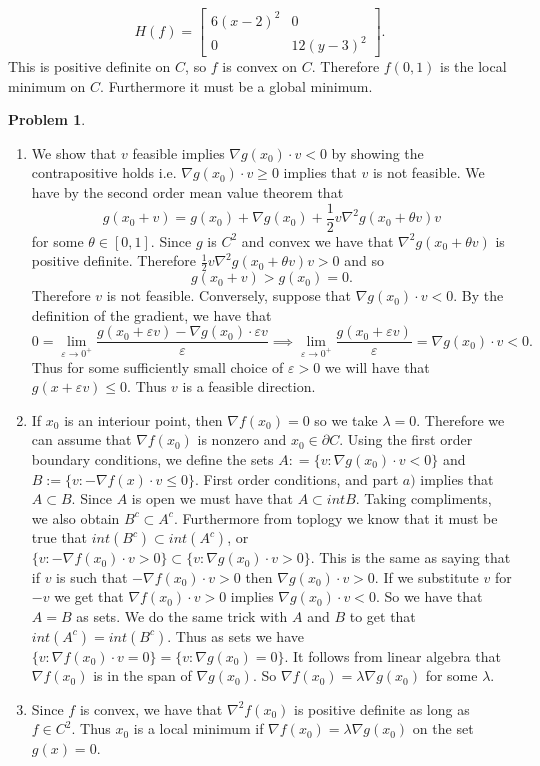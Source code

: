 \documentclass[12pt, a4paper]{article}
\newtheorem{problem}{Problem}
\theoremstyle{definition}
\newcommand{\penum}{ \begin{enumerate}[label=\bf(\alph*), leftmargin=0pt]}
\newcommand{\epenum}{ \end{enumerate} }
\newcommand{\bd}{\partial}
\newcommand{\grad}{\nabla}
\newcommand{\ep}{\varepsilon}
\newcommand{\bmat}[1]{\begin{bmatrix}#1\end{bmatrix}}
\begin{document}
$$H(f) = \bmat{6(x-2)^2 & 0 \\ 0 & 12(y-3)^2}.$$
This is positive definite on $C$, so $f$ is convex on $C$. Therefore $f(0,1)$ is the local minimum on $C$. Furthermore it must be a global minimum. 
\newpage
\begin{problem}
\end{problem}
\penum 
\item We show that $v$ feasible implies $\grad g(x_0) \cdot v<0$ by showing the contrapositive holds i.e. $\grad g(x_0)\cdot v \geq 0$ implies that $v$ is not feasible. We have by the second order mean value theorem that 
$$g(x_0 + v ) = g(x_0)  + \grad g(x_0) + \frac{1}{2} v \grad^2 g(x_0 + \theta v)v $$
 for some $\theta \in [0,1]$. Since $g$ is $C^2$ and convex we have that $\grad^2 g(x_0 + \theta v)$ is positive definite. Therefore $\frac{1}{2}v \grad^2 g(x_0 + \theta v) v >0$ and so 
 $$ g(x_0 + v ) > g(x_0) = 0.$$
 Therefore $v$ is not feasible. Conversely, suppose that $\grad g(x_0) \cdot v<0$. By the definition of the gradient, we have that 
 $$ 0 = \lim_{\ep \to 0^+} \frac{g(x_0 + \ep v)  - \grad g(x_0) \cdot \ep v}{\ep} \implies \lim_{\ep \to 0^+} \frac{g(x_0 + \ep v)}{\ep} = \grad g (x_0) \cdot v <0.$$
 Thus for some sufficiently small choice of $\ep>0$ we will have that $g(x + \ep v) \leq 0$. Thus $v$ is a feasible direction. 
 \item If $x_0$ is an interiour point, then $\grad f(x_0) = 0$ so we take $\lambda = 0$. Therefore we can assume that $\grad f(x_0)$ is nonzero and $x_0 \in \bd C$. Using the first order boundary conditions, we define the sets $A : = \{v: \grad g(x_0) \cdot v <0\}$ and $B:= \{v: -\grad f(x) \cdot v \leq 0\}$. First order conditions, and part $a)$ implies that $A \subset B$. Since $A$ is open we must have that $A \subset int B$. Taking compliments, we also obtain $B^c \subset A^c$. Furthermore from toplogy we know that it must be true that $int (B^c) \subset int(A^c)$, or $\{v : - \grad f(x_0) \cdot v >0\} \subset \{ v: \grad g(x_0) \cdot v >0\}$. This is the same as saying that if $v$ is such that $- \grad f(x_0) \cdot v >0$ then $\grad g(x_0) \cdot v >0$. If we substitute $v$ for $-v$ we get that $\grad f(x_0) \cdot v >0$ implies $\grad g(x_0) \cdot v <0$. So we have that $A= B$ as sets. We do the same trick with $A$ and $B$ to get that $int(A^c) = int(B^c)$. Thus as sets we have $\{v: \grad f(x_0) \cdot v = 0\} = \{v : \grad g(x_0) = 0\}$. It follows from linear algebra that $\grad f(x_0)$ is in the span of $\grad g(x_0)$. So $\grad f(x_0) = \lambda \grad g(x_0)$ for some $\lambda$.  
 \item Since $f$ is convex, we have that $\grad^2 f(x_0)$ is positive definite as long as $f\in C^2$.
 Thus $x_0$ is a local minimum if $\grad f(x_0) = \lambda \grad g (x_0)$ on the set $g(x) = 0$. 
\epenum
\end{document}
